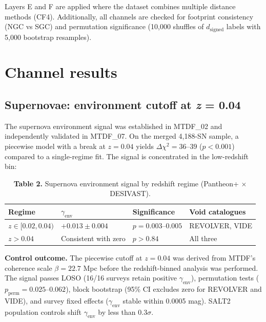 \documentclass[11pt,a4paper]{article}
\begin{document}
Layers E and F are applied where the dataset combines multiple distance methods (CF4). Additionally, all channels are checked for footprint consistency (NGC vs SGC) and permutation significance (10,000 shuffles of \(d_\mathrm{signed}\) labels with 5,000 bootstrap resamples).

\section{Channel results}
\label{sec:sec5}

\subsection{Supernovae: environment cutoff at \emph{z} = 0.04}
The supernova environment signal was established in MTDF\_\allowbreak{}02 and independently validated in MTDF\_\allowbreak{}07. On the merged 4,188-SN sample, a piecewise model with a break at \(z = 0.04\) yields \(\Delta\chi^2 = 36\text{--}39\) (\(p < 0.001\)) compared to a single-regime fit. The signal is concentrated in the low-redshift bin:

\begin{table}[H]
\centering
\footnotesize
\caption{\textbf{Table 2.} Supernova environment signal by redshift regime (Pantheon+ $\times$ DESIVAST).}
\begin{tabularx}{\linewidth}{l>{\RaggedRight\arraybackslash}X>{\RaggedRight\arraybackslash}X>{\RaggedRight\arraybackslash}X}
\toprule
\textbf{Regime} & \textbf{\(\gamma_\mathrm{env}\)} & \textbf{Significance} & \textbf{Void catalogues} \tabularnewline
\midrule
\(z \in [0.02, 0.04)\) & \(+0.013 \pm 0.004\) & \(p = 0.003\text{--}0.005\) & REVOLVER, VIDE \tabularnewline
\(z > 0.04\) & Consistent with zero & \(p > 0.84\) & All three \tabularnewline
\bottomrule
\end{tabularx}
\end{table}

\begin{mdframed}[linecolor=accent,linewidth=0.5pt,backgroundcolor=callout-bg,leftline=true,rightline=true,topline=true,bottomline=true,innerleftmargin=8pt,innerrightmargin=8pt,innertopmargin=6pt,innerbottommargin=6pt]
\textbf{Control outcome.} The piecewise cutoff at \(z = 0.04\) was derived from MTDF's coherence scale \(\beta = 22.7\) Mpc before the redshift-binned analysis was performed. The signal passes LOSO (16/\allowbreak{}16 surveys retain positive \(\gamma_\mathrm{env}\)), permutation tests (\(p_\mathrm{perm} = 0.025\text{--}0.062\)), block bootstrap (95\% CI excludes zero for REVOLVER and VIDE), and survey fixed effects (\(\gamma_\mathrm{env}\) stable within 0.0005 mag). SALT2 population controls shift \(\gamma_\mathrm{env}\) by less than 0.3\(\sigma\).
\end{mdframed}
\end{document}
